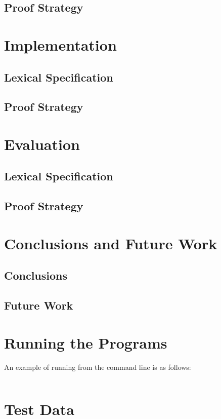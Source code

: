 \documentclass{l4proj}
\begin{document}
\section{Proof Strategy}

\chapter{Implementation}

\section{Lexical Specification}

\section{Proof Strategy}

\chapter{Evaluation}

\section{Lexical Specification}

\section{Proof Strategy}

\chapter{Conclusions and Future Work}

\section{Conclusions}

\section{Future Work}

\begin{appendices}

\chapter{Running the Programs}
An example of running from the command line is as follows:
\begin{verbatim}
\end{verbatim}

\chapter{Test Data}

\end{appendices}




\end{document}

